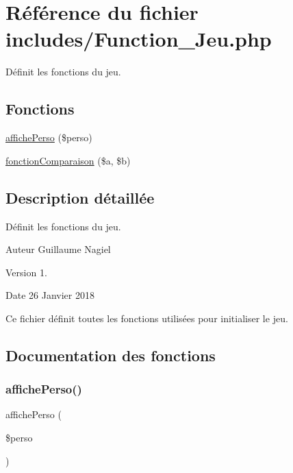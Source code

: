 \hypertarget{_function___jeu_8php}{}\section{Référence du fichier includes/\+Function\+\_\+\+Jeu.php}
\label{_function___jeu_8php}


Définit les fonctions du jeu.  


\subsection*{Fonctions}
\begin{DoxyCompactItemize}
\item 
\mbox{\hyperlink{_function___jeu_8php_a99d6d6774e3dfca9aa050319450c9799}{affiche\+Perso}} (\$perso)
\item 
\mbox{\hyperlink{_function___jeu_8php_a5a6fc05cddf49c4245e87a11976b09d4}{fonction\+Comparaison}} (\$a, \$b)
\end{DoxyCompactItemize}


\subsection{Description détaillée}
Définit les fonctions du jeu. 

\begin{DoxyAuthor}{Auteur}
Guillaume Nagiel 
\end{DoxyAuthor}
\begin{DoxyVersion}{Version}
1. 
\end{DoxyVersion}
\begin{DoxyDate}{Date}
26 Janvier 2018
\end{DoxyDate}
Ce fichier définit toutes les fonctions utilisées pour initialiser le jeu. 

\subsection{Documentation des fonctions}
\mbox{\label{_function___jeu_8php_a99d6d6774e3dfca9aa050319450c9799}} 
\subsubsection{\texorpdfstring{affiche\+Perso()}{affichePerso()}}
{\footnotesize\ttfamily affiche\+Perso (\begin{DoxyParamCaption}\item[{}]{\$perso }\end{DoxyParamCaption})}

